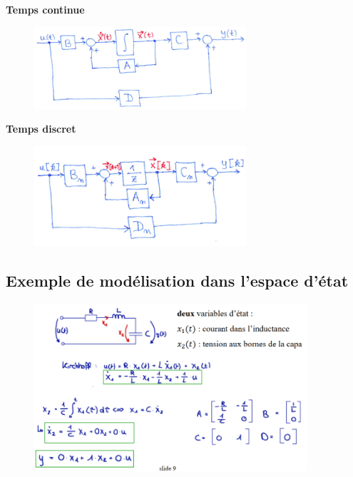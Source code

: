 \documentclass[document.tex]{subfiles}
\begin{document}
\textbf{Temps continue}

\begin{figure}[H]
    \centering
    \includegraphics[width=0.7\textwidth]{Include/Figure/15.png}
\end{figure}

\textbf{Temps discret}

\begin{figure}[H]
    \centering
    \includegraphics[width=0.7\textwidth]{Include/Figure/16.png}
\end{figure}

\subsection{Exemple de modélisation dans l'espace d'état}

\begin{figure}[H]
    \centering
    \includegraphics[width=0.9\textwidth]{Include/Figure/11.png}
\end{figure}
\end{document}
